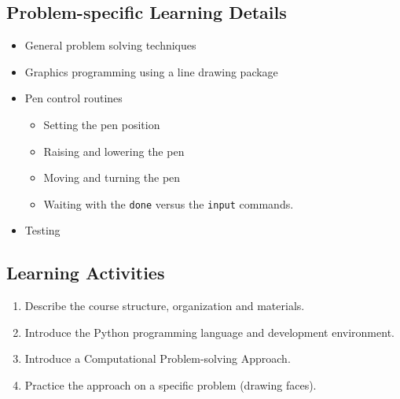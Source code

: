 \documentclass[pdftex,12pt]{artikel3}
\begin{document}
\subsection{Problem-specific Learning Details} %

\begin{itemize}
\item
  General problem solving techniques
\item
  Graphics programming using a line drawing package
\item
  Pen control routines
    \begin{itemize}
    \item
    Setting the pen position
    \item
    Raising and lowering the pen
    \item
    Moving and turning the pen 
    \item
    Waiting with the {\tt done} versus the {\tt input} commands.
    \end{itemize}
\item
  Testing
\end{itemize}

\subsection{Learning Activities}

\begin{enumerate}
\item
  Describe the course structure, organization and materials.
\item
  Introduce the Python programming language and development environment.
\item
  Introduce a Computational Problem-solving Approach.
\item
  Practice the approach on a specific problem (drawing faces).
\end{enumerate}
\end{document}
